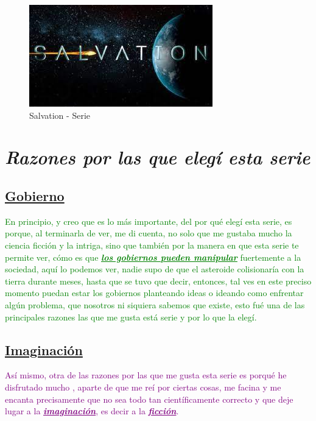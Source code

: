 \documentclass[a5paper,11pt]{article}
\begin{document}
\begin{figure}

    \begin{flushright}
    \caption*{Salvation - Serie }
    \includegraphics[scale=0.40,angle=15]{salvation.jpg}
    \end{flushright}
\end{figure}    

\pagestyle{fancy}

    \fancyhf{}
    \rfoot{\thepage}
    
\section{\Large{\emph{Razones por las que elegí esta serie}}}
    \subsection{\large{\underline{Gobierno}}} \small{\textcolor{green}{En principio, y creo que es lo más importante, del por qué elegí esta serie, es porque, al terminarla de ver, me di cuenta, no solo que me gustaba mucho la ciencia ficción y la intriga, sino que también por la manera en que esta serie te permite ver, cómo es que {\textbf{\emph{\underline{los gobiernos  pueden manipular}}}} fuertemente a la sociedad, aquí lo podemos ver, nadie supo de que el asteroide colisionaría con la tierra durante meses, hasta que se tuvo que decir, entonces, tal ves en este preciso momento puedan estar los gobiernos planteando ideas o ideando como enfrentar algún problema, que nosotros ni siquiera sabemos que existe, esto fué una de las principales razones las que me gusta está serie y por lo que la elegí.}}
    
    \subsection{\large{\underline{Imaginación}}} \small{\textcolor{purple}{Así mismo, otra de las razones por las que me gusta esta serie es porqué he disfrutado mucho , aparte de que me reí por ciertas cosas, me facina y me encanta precisamente que no sea todo tan científicamente correcto y que deje lugar a la {\textbf{\emph{\underline{imaginación}}}}, es decir a la {\textbf{\emph{\underline{ficción}}}}.}}
    
\end{document}
